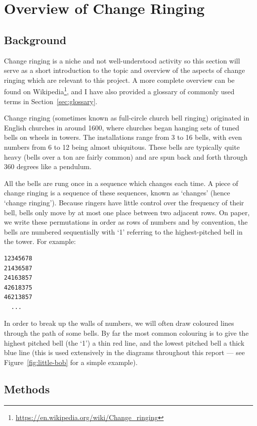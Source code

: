 \documentclass[12pt]{article}
\newcommand{\footurl}[1]{\footnote{\url{#1}}}
\begin{document}
\pagebreak

\section{Overview of Change Ringing}

\subsection{Background}

Change ringing is a niche and not well-understood activity so this section will serve as a short
introduction to the topic and overview of the aspects of change ringing which are relevant to this
project.  A more complete overview can be found on
Wikipedia\footurl{https://en.wikipedia.org/wiki/Change_ringing}, and I have also provided a glossary of
commonly used terms in Section~\ref{sec:glossary}.

Change ringing (sometimes known as full-circle church bell ringing) originated in English
churches in around 1600, where churches began hanging sets of tuned bells on wheels in towers.
The installations range from 3 to 16 bells, with even numbers from 6 to 12 being almost ubiquitous.
These bells are typically quite heavy (bells over a ton are fairly common) and are spun
back and forth through 360 degrees like a pendulum.

All the bells are rung once in a sequence which
changes each time.  A piece of change ringing is a sequence of these sequences, known as `changes'
(hence `change ringing').  Because ringers have little control over the frequency of their bell,
bells only move by at most one place between two adjacent rows.  On paper, we write these
permutations in order as rows of numbers and by convention, the bells are numbered sequentially with
`1' referring to the highest-pitched bell in the tower.  For example:

\begin{verbatim}
12345678
21436587
24163857
42618375
46213857
  ...
\end{verbatim}

In order to break up the walls of numbers, we will often draw coloured lines through the path of
some bells.  By far the most common colouring is to give the highest pitched bell (the `1') a thin red line,
and the lowest pitched bell a thick blue line (this is used extensively in the diagrams throughout
this report --- see Figure~\ref{fig:little-bob} for a simple example).  

\subsection{Methods}
\end{document}

